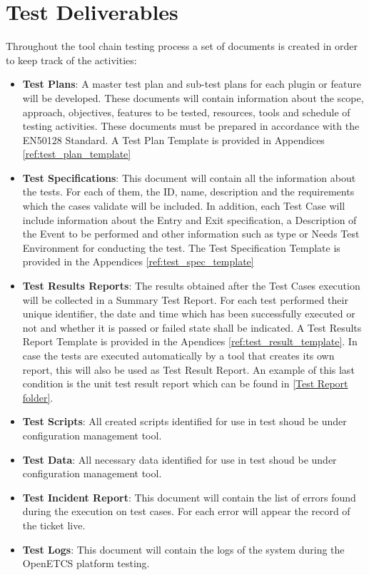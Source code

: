\section{Test Deliverables}
Throughout the tool chain testing process a set of documents is created in order to keep track of the activities:
\begin{itemize}
\item \textbf{Test Plans}: A master test plan and sub-test plans for each plugin or feature will be developed. These documents will contain information about the scope, approach, objectives, features to be tested, resources, tools and schedule of testing activities.  These documents must be prepared in accordance with the EN50128 Standard. A Test Plan Template is provided in Appendices \ref{ref:test_plan_template}
\item \textbf{Test Specifications}: This document will contain all the information about the tests. For each of them, the ID, name, description and the requirements which the cases validate will be included. In addition, each Test Case will include information about the Entry and Exit specification, a Description of the Event to be performed and other information such as type or Needs Test Environment for conducting the test. The Test Specification Template is provided in the Appendices \ref{ref:test_spec_template}
\item \textbf{Test Results Reports}: The results obtained after the Test Cases execution will be collected in a Summary Test Report. For each test performed their unique identifier, the date and time which has been successfully executed or not and whether it is passed or failed state shall be indicated. A Test Results Report Template is provided in the Apendices \ref{ref:test_result_template}. In case the tests are executed automatically by a tool that creates its own report, this will also be used as Test Result Report. An example of this last condition is the unit test result report which can be found in \href{https://openetcs.ci.cloudbees.com/job/openETCS-tycho/lastBuild/testReport/}{[Test Report folder]}.
\item \textbf{Test Scripts}: All created scripts identified for use in test shoud be under configuration management tool.
\item \textbf{Test Data}: All necessary data identified for use in test shoud be under configuration management tool.
\item \textbf{Test Incident Report}: This document will contain the list of errors found during the execution on test cases. For each error will appear the record of the ticket live.  
\item \textbf{Test Logs}: This document will contain the logs of the system during the OpenETCS platform testing.
\end{itemize}

